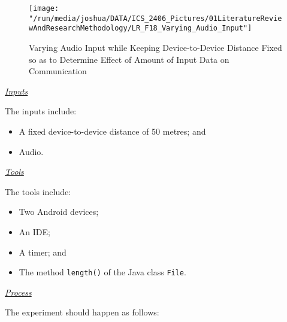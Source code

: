 \documentclass[12pt,svgnames,smaller]{article} %
\begin{document}
\begin{enumerate}
			\begin{figure}
				\centering
				\texttt{[image: "/run/media/joshua/DATA/ICS\_2406\_Pictures/01LiteratureReviewAndResearchMethodology/LR\_F18\_Varying\_Audio\_Input"]}
				\caption{Varying Audio Input while Keeping Device-to-Device Distance Fixed so as to Determine Effect of Amount of Input Data on Communication}
				\label{fig:LiteratureReview-Figure18}
			\end{figure}
			
			\textsf{\underline{\emph{Inputs}}}
			
			The inputs include:
			
			\begin{itemize}
				\item A fixed device-to-device distance of 50 metres; and
				\item Audio.
			\end{itemize}
			
			\emph{\underline{\textsf{Tools}}}
			
			The tools include:
			
			\begin{itemize}
				\item Two Android devices; 
				\item An IDE;
				\item A timer; and
				\item The method \texttt{length()} of the Java class \texttt{File}. 
			\end{itemize}
			
			\emph{\underline{\textsf{Process}}}
			
			The experiment should happen as follows:
			

\end{enumerate}
\end{document}

